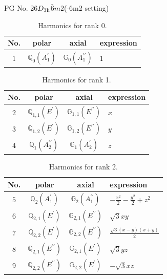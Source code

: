 \documentclass[fleqn,8pt,landscape]{jsarticle}
\begin{document}
\setcounter{MaxMatrixCols}{32}

\renewcommand{\tablename}{Table~}
\renewcommand{\figurename}{Figure~}
\begin{center}
\LARGE
PG No. 26\quad$D_{\rm 3h}$\quad$\bar{6}m2$\quad(-6m2 setting)\quad[ hexagonal ]
\end{center}
\begin{table}[ht!]
\begin{center}
\caption{Harmonics for rank 0.}
\renewcommand{\arraystretch}{1.3}
\begin{tabular}{cccl} \hline \hline
No. & polar & axial & expression \\ \hline
$ 1 $ & $ \mathbb{Q}_{0}(A_{1}^{\prime}) $ & $ \mathbb{G}_{0}(A_{1}^{\prime\prime}) $ & $ 1 $ \\
 \hline \hline
\end{tabular}
\end{center}
\end{table}
\begin{table}[ht!]
\begin{center}
\caption{Harmonics for rank 1.}
\renewcommand{\arraystretch}{1.3}
\begin{tabular}{cccl} \hline \hline
No. & polar & axial & expression \\ \hline
$ 2 $ & $ \mathbb{Q}_{1,1}(E^{\prime}) $ & $ \mathbb{G}_{1,1}(E^{\prime\prime}) $ & $ x $ \\
$ 3 $ & $ \mathbb{Q}_{1,2}(E^{\prime}) $ & $ \mathbb{G}_{1,2}(E^{\prime\prime}) $ & $ y $ \\
$ 4 $ & $ \mathbb{Q}_{1}(A_{2}^{\prime\prime}) $ & $ \mathbb{G}_{1}(A_{2}^{\prime}) $ & $ z $ \\
 \hline \hline
\end{tabular}
\end{center}
\end{table}
\begin{table}[ht!]
\begin{center}
\caption{Harmonics for rank 2.}
\renewcommand{\arraystretch}{1.3}
\begin{tabular}{cccl} \hline \hline
No. & polar & axial & expression \\ \hline
$ 5 $ & $ \mathbb{Q}_{2}(A_{1}^{\prime}) $ & $ \mathbb{G}_{2}(A_{1}^{\prime\prime}) $ & $ - \frac{x^{2}}{2} - \frac{y^{2}}{2} + z^{2} $ \\
$ 6 $ & $ \mathbb{Q}_{2,1}(E^{\prime}) $ & $ \mathbb{G}_{2,1}(E^{\prime\prime}) $ & $ \sqrt{3} x y $ \\
$ 7 $ & $ \mathbb{Q}_{2,2}(E^{\prime}) $ & $ \mathbb{G}_{2,2}(E^{\prime\prime}) $ & $ \frac{\sqrt{3} \left(x - y\right) \left(x + y\right)}{2} $ \\
$ 8 $ & $ \mathbb{Q}_{2,1}(E^{\prime\prime}) $ & $ \mathbb{G}_{2,1}(E^{\prime}) $ & $ \sqrt{3} y z $ \\
$ 9 $ & $ \mathbb{Q}_{2,2}(E^{\prime\prime}) $ & $ \mathbb{G}_{2,2}(E^{\prime}) $ & $ - \sqrt{3} x z $ \\
 \hline \hline
\end{tabular}
\end{center}
\end{table}
\end{document}
